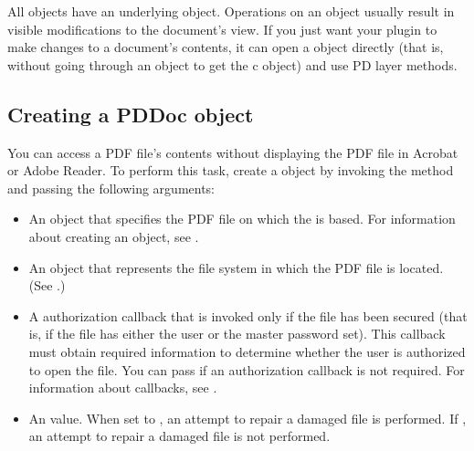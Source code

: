 \documentclass[letterpaper,12pt,english,openany,oneside]{sphinxmanual}
\begin{document}
All  objects have an underlying  object. Operations on an  object usually result in visible modifications to the document’s view. If you just want your plugin to make changes to a document’s contents, it can open a  object directly (that is, without going through an  object to get the  c object) and use PD layer methods.


\subsection{Creating a PDDoc object}
\label{\detokenize{Plugins_Documents:creating-a-pddoc-object}}
You can access a PDF file’s contents without displaying the PDF file in Acrobat or Adobe Reader. To perform this task, create a  object by invoking the  method and passing the following arguments:
\begin{itemize}
\item {} 
An  object that specifies the PDF file on which the  is based. For information about creating an  object, see .

\item {} 
An  object that represents the file system in which the PDF file is located. (See .)

\item {} 
A  authorization callback that is invoked only if the file has been secured (that is, if the file has either the user or the master password set). This callback must obtain required information to determine whether the user is authorized to open the file. You can pass  if an authorization callback is not required. For information about callbacks, see .

\item {} 
An  value. When set to , an attempt to repair a damaged file is performed. If , an attempt to repair a damaged file is not performed.

\end{itemize}
\end{document}
